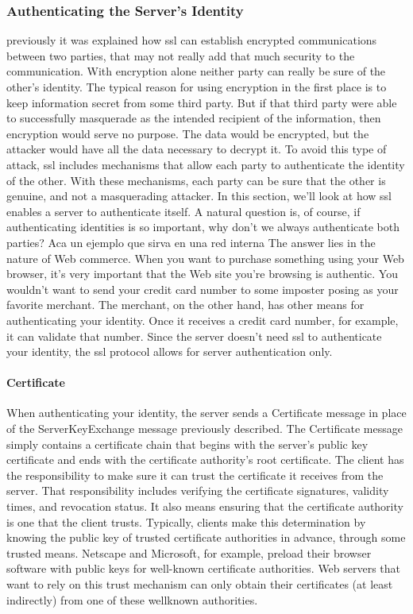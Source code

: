 \subsubsection*{Authenticating the Server’s Identity}
previously it was explained how ssl can establish encrypted
communications between two parties, that may not really add that
much security to the communication. With encryption alone neither
party can really be sure of the other’s identity. The typical reason for
using encryption in the first place is to keep information secret from
some third party. But if that third party were able to successfully
masquerade as the intended recipient of the information, then encryption 
would serve no purpose. The data would be encrypted, but
the attacker would have all the data necessary to decrypt it.
To avoid this type of attack, ssl includes mechanisms that allow each
party to authenticate the identity of the other. With these mechanisms, 
each party can be sure that the other is genuine, and not a
masquerading attacker. In this section, we’ll look at how ssl enables a
server to authenticate itself.
A natural question is, of course, if authenticating identities is so important,
 why don’t we always authenticate both parties? 
 Aca un ejemplo que sirva en una red interna
 The answer
lies in the nature of Web commerce. When you want to purchase
something using your Web browser, it’s very important that the Web
site you’re browsing is authentic. You wouldn’t want to send your
credit card number to some imposter posing as your favorite merchant. 
The merchant, on the other hand, has other means for
authenticating your identity. Once it receives a credit card number,
for example, it can validate that number. Since the server doesn’t
need ssl to authenticate your identity, the ssl protocol allows for
server authentication only. 

\paragraph*{Certificate}
When authenticating your identity, the server sends a Certificate message 
in place of the ServerKeyExchange message previously described. The Certificate 
message simply contains a certificate chain
that begins with the server’s public key certificate and ends with the
certificate authority’s root certificate.
The client has the responsibility to make sure it can trust the certificate it 
receives from the server. That responsibility includes verifying
the certificate signatures, validity times, and revocation status. It also
means ensuring that the certificate authority is one that the client
trusts. Typically, clients make this determination by knowing the
public key of trusted certificate authorities in advance, through some
trusted means. Netscape and Microsoft, for example, preload their
browser software with public keys for well-known certificate authorities. 
Web servers that want to rely on this trust mechanism can only
obtain their certificates (at least indirectly) from one of these wellknown
 authorities.

